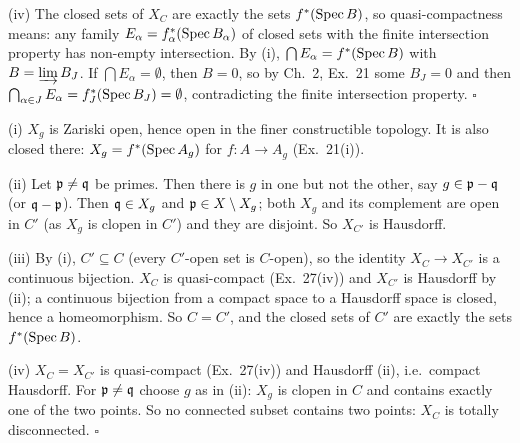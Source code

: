 \documentclass[11pt]{article}
\begin{document}
(iv) The closed sets of $X_C$ are exactly the sets $f^*(\operatorname{Spec} B)$, so quasi-compactness means: any family $E_\alpha=f_\alpha^*(\operatorname{Spec} B_\alpha)$ of closed sets with the finite intersection property has non-empty intersection. By (i), $\bigcap E_\alpha=f^*(\operatorname{Spec} B)$ with $B=\varinjlim B_J$. If $\bigcap E_\alpha=\emptyset$, then $B=0$, so by Ch.~2, Ex.~21 some $B_J=0$ and then $\bigcap_{\alpha\in J}E_\alpha=f_J^*(\operatorname{Spec} B_J)=\emptyset$, contradicting the finite intersection property. \hfill$\square$

\pf
(i) $X_g$ is Zariski open, hence open in the finer constructible topology. It is also closed there: $X_g=f^*(\operatorname{Spec} A_g)$ for $f:A\to A_g$ (Ex.~21(i)).

(ii) Let $\mathfrak p\ne\mathfrak q$ be primes. Then there is $g$ in one but not the other, say $g\in\mathfrak p-\mathfrak q$ (or $\mathfrak q-\mathfrak p$). Then $\mathfrak q\in X_g$ and $\mathfrak p\in X\setminus X_g$; both $X_g$ and its complement are open in $C'$ (as $X_g$ is clopen in $C'$) and they are disjoint. So $X_{C'}$ is Hausdorff.

(iii) By (i), $C'\subseteq C$ (every $C'$-open set is $C$-open), so the identity $X_C\to X_{C'}$ is a continuous bijection. $X_C$ is quasi-compact (Ex.~27(iv)) and $X_{C'}$ is Hausdorff by (ii); a continuous bijection from a compact space to a Hausdorff space is closed, hence a homeomorphism. So $C=C'$, and the closed sets of $C'$ are exactly the sets $f^*(\operatorname{Spec} B)$.

(iv) $X_C=X_{C'}$ is quasi-compact (Ex.~27(iv)) and Hausdorff (ii), i.e.\ compact Hausdorff. For $\mathfrak p\ne\mathfrak q$ choose $g$ as in (ii): $X_g$ is clopen in $C$ and contains exactly one of the two points. So no connected subset contains two points: $X_C$ is totally disconnected. \hfill$\square$
\end{document}
